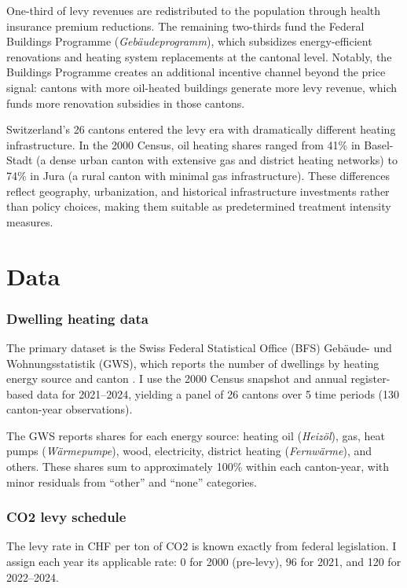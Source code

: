 \documentclass[12pt]{article}
\begin{document}
One-third of levy revenues are redistributed to the population through health insurance premium reductions. The remaining two-thirds fund the Federal Buildings Programme (\textit{Geb\"audeprogramm}), which subsidizes energy-efficient renovations and heating system replacements at the cantonal level. Notably, the Buildings Programme creates an additional incentive channel beyond the price signal: cantons with more oil-heated buildings generate more levy revenue, which funds more renovation subsidies in those cantons.

Switzerland's 26 cantons entered the levy era with dramatically different heating infrastructure. In the 2000 Census, oil heating shares ranged from 41\% in Basel-Stadt (a dense urban canton with extensive gas and district heating networks) to 74\% in Jura (a rural canton with minimal gas infrastructure). These differences reflect geography, urbanization, and historical infrastructure investments rather than policy choices, making them suitable as predetermined treatment intensity measures.


\section{Data}
\label{sec:data}

\subsubsection*{Dwelling heating data} The primary dataset is the Swiss Federal Statistical Office (BFS) Geb\"aude- und Wohnungsstatistik (GWS), which reports the number of dwellings by heating energy source and canton \citep{bfs2024}. I use the 2000 Census snapshot and annual register-based data for 2021--2024, yielding a panel of 26 cantons over 5 time periods (130 canton-year observations).

The GWS reports shares for each energy source: heating oil (\textit{Heiz\"ol}), gas, heat pumps (\textit{W\"armepumpe}), wood, electricity, district heating (\textit{Fernw\"arme}), and others. These shares sum to approximately 100\% within each canton-year, with minor residuals from ``other'' and ``none'' categories.

\subsubsection*{CO2 levy schedule} The levy rate in CHF per ton of CO2 is known exactly from federal legislation. I assign each year its applicable rate: 0 for 2000 (pre-levy), 96 for 2021, and 120 for 2022--2024.
\end{document}
